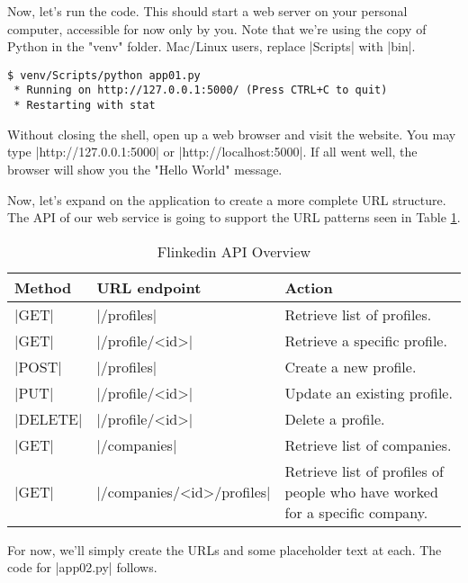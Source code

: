 \documentclass[11pt]{book}
\newcommand{\head}[1]{\textnormal{\textbf{#1}}} %
\begin{document}
Now, let's run the code.  This should start a web server on your personal computer, accessible for now only by you.  Note that we're using the copy of Python in the "venv" folder.  Mac/Linux users, replace |Scripts| with |bin|.

\begin{verbatim}
$ venv/Scripts/python app01.py
 * Running on http://127.0.0.1:5000/ (Press CTRL+C to quit)
 * Restarting with stat
\end{verbatim}

Without closing the shell, open up a web browser and visit the website.  You may type |http://127.0.0.1:5000| or |http://localhost:5000|.  If all went well, the browser will show you the "Hello World" message.

Now, let's expand on the application to create a more complete URL structure.  The API of our web service is going to support the URL patterns seen in Table \ref{tab:flinkedinapi}.

\begin{table}
\centering
\caption{Flinkedin API Overview}\label{tab:flinkedinapi}
\vspace{10pt}
\begin{tabular}{llp{5cm}}
    \toprule[1.5pt]
    \head{Method} & \head{URL endpoint} & \head{Action} \\
    \midrule
    |GET| & |/profiles| & Retrieve list of profiles.\\
    \midrule
    |GET| & |/profile/<id>| & Retrieve a specific profile.\\
    \midrule
    |POST| & |/profiles| & Create a new profile.\\
    \midrule
    |PUT| & |/profile/<id>| & Update an existing profile.\\
    \midrule
    |DELETE| & |/profile/<id>| & Delete a profile.\\
    \midrule
    |GET| & |/companies| & Retrieve list of companies.\\
    \midrule
    |GET| & |/companies/<id>/profiles| & Retrieve list of profiles of people who have worked for a specific company.\\
    \bottomrule[1.5pt]
\end{tabular}
\end{table}

For now, we'll simply create the URLs and some placeholder text at each.  The code for |app02.py| follows.
\end{document}
